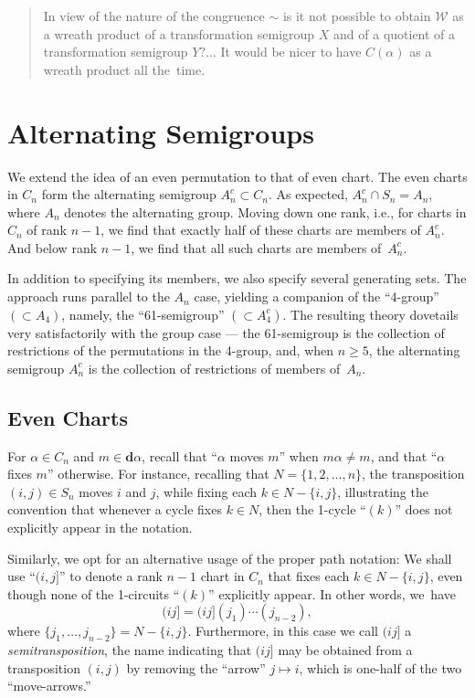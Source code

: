 \documentclass{surv-l}
\numberwithin{equation}{section}
\numberwithin{table}{section}
\numberwithin{figure}{section}
\theoremstyle{definition}
\begin{document}
\begin{quote}
\quad In view of the nature of the congruence $\sim$ is it not possible
to obtain $\mathcal{W}$ as a wreath product of a transformation
semigroup $X$ and of a quotient of a transformation semigroup $Y? \ldots$
It would be nicer to have $C(\alpha)$ as a wreath product
all the~time.
\end{quote}

\chapter{Alternating Semigroups}\label{chap6}

We extend the idea of an even permutation to that of even chart.
The even charts in $C_{n}$ form the
alternating semigroup
$A_{n}^{c}\subset C_{n}$. As expected, $A_{n}^{c}\cap
S_{n}=A_{n}$, where $A_{n}$ denotes the alternating group. Moving
down one rank, i.e., for charts in $C_{n}$ of rank $n -1$, we find
that exactly half of these charts are members of $A_{n}^{c}$. And
below rank $n-1$, we find that all such charts are members
of~$A_{n}^{c}$.

In addition to specifying its members, we also specify several
generating sets. The approach runs parallel to the $A_{n}$ case,
yielding a companion of the ``4-group'' $(\subset A_{4})$, namely,
the ``61-semigroup'' $(\subset A_{4}^{c})$. The resulting theory
dovetails very satisfactorily with the group case --- the
61-semigroup is the collection of restrictions of the permutations
in the 4-group, and, when $n \geq 5$, the alternating semigroup
$A_{n}^{c}$ is the collection of restrictions of members
of~$A_{n}$.

\setcounter{section}{23}
\section{Even Charts}\label{sec6.24}

For $\alpha\in C_{n}$ and $m\in \mathbf{d}\alpha$, recall that
``$\alpha$ moves $m$'' when $m\alpha\neq m$, and that ``$\alpha$
fixes $m$'' otherwise. For instance, recalling that
$N=\{1,2,\ldots, n\}$, the transposition $(i,j)\in S_{n}$ moves
$i$ and $j$, while fixing each $k\in N-\{i,j\}$, illustrating the
convention that whenever a cycle fixes $k\in N$, then the 1-cycle
``$(k)$'' does not explicitly appear in the notation.

Similarly, we opt for an alternative usage of the proper path
notation: We shall use ``$(i, j]$'' to denote a rank $n-1$ chart
in $C_{n}$ that fixes each $k\in N-\{i, j\}$, even though none of
the 1-circuits ``$(k)$'' explicitly appear. In other words,
we~have
\[
(ij]=(ij](j_{1})\cdots(j_{n-2}),
\]
where $\{j_{1},\ldots,j_{n-2}\}=N-\{i, j\}$. Furthermore, in this
case we call $(ij]$ a
\emph{semitransposition}, the name
indicating that $(ij]$ may be obtained from a transposition
$(i,j)$ by removing the ``arrow'' $j\mapsto i$, which is one-half
of the two ``move-arrows.''
\end{document}
